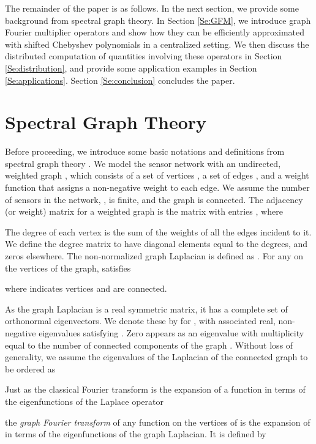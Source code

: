 \documentclass[conference]{IEEEtran}
\begin{document}
The remainder of the paper is as follows. In the next section, we provide some background from
spectral graph theory. In Section \ref{Se:GFM}, we introduce graph Fourier multiplier operators and show how they can be efficiently approximated with shifted Chebyshev polynomials in a centralized setting. We then discuss the distributed computation of quantities involving these operators in Section \ref{Se:distribution}, and provide some application examples in Section \ref{Se:applications}. Section \ref{Se:conclusion} concludes the paper.








\section{Spectral Graph Theory} \label{Se:SGT}
Before proceeding, we introduce some basic notations and definitions from spectral graph theory \cite{chung}. We model the sensor network with an undirected, weighted graph , which consists of a set of vertices , a
set of edges , and a weight function  that assigns a
non-negative weight to each edge. We assume the number of sensors in the network, , is finite, and the graph is connected. The adjacency (or weight) matrix  for a weighted graph  is the  matrix with entries , where

The degree of each vertex is the sum of the weights of all the edges incident
to it. We define the degree matrix 
to have diagonal elements equal to the degrees, and zeros elsewhere.
The non-normalized graph Laplacian is defined as . For any  on the vertices of the graph,  satisfies

where  indicates vertices  and  are connected. 

As the graph Laplacian  is a real symmetric
matrix, it has a complete set of orthonormal eigenvectors. We denote
these by  for , with associated real, non-negative eigenvalues
 satisfying .
Zero appears as an eigenvalue with multiplicity equal to the
number of connected components of the graph
\cite{chung}.
Without loss of generality, we assume the eigenvalues of the Laplacian of the connected graph  to be ordered as


Just as the classical Fourier transform is the expansion of a function  in terms of the eigenfunctions of the Laplace operator

the \emph{graph Fourier transform}  of any function  on the vertices of 
is the expansion of  in terms of the eigenfunctions of the graph Laplacian. It is defined by
\end{document}
